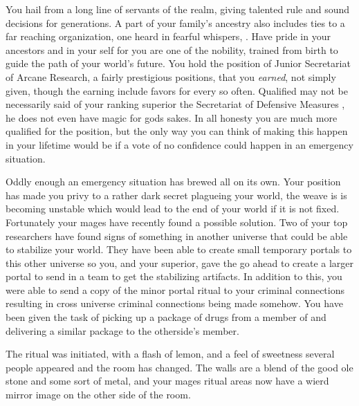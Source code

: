 \documentclass[char]{guildcamp3}
\begin{document}
\name{\cNobleTwo{}}

You hail from a long line of servants of the realm, giving talented rule and sound decisions for generations. A part of your family's ancestry also includes ties to a far reaching organization, one heard in fearful whispers, \bMagicMob{}. Have pride in your ancestors and in your self for you are one of the nobility, trained from birth to guide the path of your world's future. You hold the position of Junior Secretariat of Arcane Research, a fairly prestigious positions, that you \emph{earned}, not simply given, though the earning include favors for \bMagicMob{} every so often. Qualified may not be necessarily said of your ranking superior the Secretariat of Defensive Measures \cNobleOne{}, he does not even have magic for gods sakes. In all honesty you are much more qualified for the position, but the only way you can think of making this happen in your lifetime would be if a vote of no confidence could happen in an emergency situation. 

Oddly enough an emergency situation has brewed all on its own. Your position has made you privy to a rather dark secret plagueing your world, the weave is is becoming unstable which would lead to the end of your world if it is not fixed. Fortunately your mages have recently found a possible solution. Two of your top researchers have found signs of something in another universe that could be able to stabilize your world. They have been able to create small temporary portals to this other universe so you, and your superior, gave the go ahead to create a larger portal to send in a team to get the stabilizing artifacts. In addition to this, you were able to send a copy of the minor portal ritual to your criminal connections resulting in cross universe criminal connections being made somehow. You have been given the task of picking up a package of drugs from a member of \bTechMob{} and delivering a similar package to the otherside's member. 



The ritual was initiated, with a flash of lemon, and a feel of sweetness several people appeared and the room has changed. The walls are a blend of the good ole stone and some sort of metal, and your mages ritual areas now have a wierd mirror image on the other side of the room. 
\end{document}
